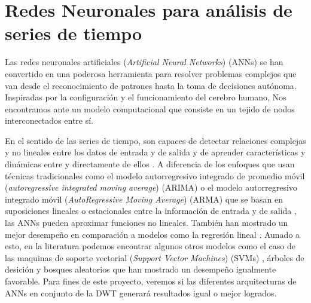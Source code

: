 \chapter{Redes Neuronales para análisis de series de tiempo} %
\label{cap:RN} 

Las redes neuronales artificiales (\textit{Artificial Neural Networks}) (ANNs) se han convertido en una poderosa herramienta para resolver problemas complejos que van desde el reconocimiento de patrones hasta la toma de decisiones autónoma. Inspiradas por la configuración y el funcionamiento del cerebro humano, Nos encontramos ante un modelo computacional que consiste en un tejido de nodos interconectados entre sí. 

En el sentido de las series de tiempo, son capaces de detectar relaciones complejas y no lineales entre los datos de entrada y de salida y de aprender características y dinámicas entre y directamente de ellos \cite{Marco_TSF_Att}. A diferencia de los enfoques que usan técnicas tradicionales como el modelo autorregresivo integrado de promedio móvil (\textit{autoregressive integrated moving average}) (ARIMA) o el modelo autorregresivo integrado móvil (\textit{AutoRegressive Moving Average}) (ARMA) que se basan en suposiciones lineales o estacionales entre la información de entrada y de salida \cite{CorrOancea2014} \cite{electric_ARMA_ARIMA}, las ANNs pueden aproximar funciones no lineales. También han mostrado un mejor desempeño en comparación a modelos como la regresión lineal \cite{altay2005stock}. Aunado a esto, en la literatura podemos encontrar algunos otros modelos como el caso de las maquinas de soporte vectorial (\textit{Support Vector Machines}) (SVMs) \cite{YANG202218_SVM1} \cite{parray2020time}, árboles de desición \cite{arboles1} y bosques aleatorios \cite{khan2020predicting_randomforest22} \cite{randomforest1} que han mostrado un desempeño igualmente favorable. Para fines de este proyecto, veremos si las diferentes arquitecturas de ANNs en conjunto de la DWT generará resultados igual o mejor logrados.




